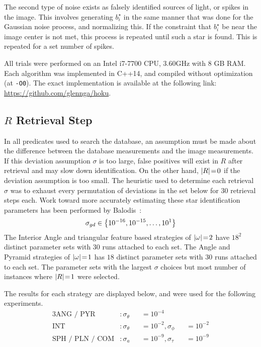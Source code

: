 The second type of noise exists as falsely identified sources of light, or spikes in the image.
This involves generating $b^\star_i$ in the same manner that was done for the Gaussian noise process, and normalizing
this.
If the constraint that $b^\star_i$ be near the image center is not met, this process is repeated until such a star is
found.
This is repeated for a set number of spikes.

All trials were performed on an Intel i7-7700 CPU, 3.60GHz with 8 GB RAM\@.
Each algorithm was implemented in C++14, and compiled without optimization (at \texttt{-O0}).
The exact implementation is available at the following link:
\url{https://github.com/glennga/hoku}.

\subsection{$R$ Retrieval Step}\label{subsec:catalogQueryStep}
In all predicates used to search the database, an assumption must be made about the difference between the database
measurements and the image measurements.
If this deviation assumption $\sigma$ is too large, false positives will exist in $R$ after retrieval and may slow
down identification.
On the other hand, $\left| R \right| \!=\! 0$ if the deviation assumption is too small.
The heuristic used to determine each retrieval $\sigma$ was to exhaust every permutation of deviations in the set below for
30 retrieval steps each.
Work toward more accurately estimating these star identification parameters has been performed by
Balodis~\cite{balodis:parametersAutomated}:
\begin{equation}
    \sigma_{gd} \in \left\{  10^{-16}, 10^{-15}, \ldots, 10^1  \right\}
\end{equation}
The Interior Angle and triangular feature based strategies of $\left| \omega \right| \!=\! 2$ have $18^2$ distinct parameter sets
with 30 runs attached to each set.
The Angle and Pyramid strategies of $\left| \omega \right| \!=\! 1$ has $18$ distinct parameter sets with 30 runs attached to each set.
The parameter sets with the largest $\sigma$ choices but most number of instances where $\left| R \right| \!=\! 1$ were selected.

The results for each strategy are displayed below, and were used for the following experiments.
\begin{alignat*}{3}
    \text{ANG / PYR}&: \sigma_\theta &&= 10^{-4} &&{}\\
    \text{INT}&: \sigma_\theta &&= 10^{-2}, \sigma_\phi &&= 10^{-2} \\
    \text{SPH / PLN / COM}&: \sigma_a &&= 10^{-9}, \sigma_\tau &&= 10^{-9}
\end{alignat*}


